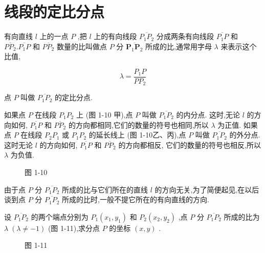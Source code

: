 \documentclass[lang=cn,newtx,12pt,scheme=chinese]{elegantbook}
\begin{document}
\section{线段的定比分点}

\begin{definition}[定比分点] \label{def:int}
	
有向直线 \(l\) 上的一点 \(P\) ,把 \(l\) 上的有向线段 \(\overline{{P}_{1}{P}_{2}}\) 分成两条有向线段 \(\overline{{P}_{1}P}\) 和 \(\overline{P{P}_{2}}.\overline{{P}_{1}P}\) 和 \(\overline{P{P}_{2}}\) 数量的比叫做点 \(P\) 分 \(\overline{{\mathbf{P}}_{1}{\mathbf{P}}_{2}}\) 所成的比,通常用字母 \(\lambda\) 来表示这个比值,

\[
  \lambda = \frac{{P}_{1}P}{P{P}_{2}}
\]

点 \(P\) 叫做 \(\overline{{P}_{1}{P}_{2}}\) 的定比分点.
\end{definition}

\begin{corollary}[内外分点]
如果点 \(P\) 在线段 \({P}_{1}{P}_{2}\) 上 (图 1-10 甲),点 \(P\) 叫做 \(\overline{{P}_{1}{P}_{2}}\) 的内分点. 这时,无论 \(l\) 的方向如何, \(\overline{{P}_{1}P}\) 和 \(\overline{P{P}_{2}}\) 的方向都相同,它们的数量的符号也相同,所以 \(\lambda\) 为正值. 如果点 \(P\) 在线段 \({P}_{2}{P}_{1}\) 或 \({P}_{1}{P}_{2}\) 的延长线上 (图 1-10乙、丙),点 \(P\) 叫做 \(\overline{{P}_{1}{P}_{2}}\) 的外分点. 这时无论 \(l\) 的方向如何, \(\overline{{P}_{1}P}\) 和 \(\overline{P{P}_{2}}\) 的方向都相反, 它们的数量的符号也相反,所以 \(\lambda\) 为负值.
\end{corollary}

\begin{figure}[h]
  \centering
  
  \caption{图 1-10}
\end{figure}

由于点 \(P\) 分 \(\overline{{P}_{1}{P}_{2}}\) 所成的比与它们所在的直线 \(l\) 的方向无关,为了简便起见,在以后谈到点 \(P\) 分 \(\overline{{P}_{1}{P}_{2}}\) 所成的比时,一般不提它所在的有向直线的方向.

设 \(\overline{{P}_{1}{P}_{2}}\) 的两个端点分别为 \({P}_{1}\left( {{x}_{1},{y}_{1}}\right)\) 和 \({P}_{2}\left( {{x}_{2},{y}_{2}}\right)\) ,点 \(P\) 分 \(\overline{{P}_{1}{P}_{2}}\) 所成的比为 \(\lambda \;\left( {\lambda \neq - 1}\right)\) (图 1-11),求分点 \(P\) 的坐标 \(\left( {x,y}\right)\) .

\begin{figure}[h]
	\centering
	
	\caption{图 1-11}
\end{figure}
\end{document}
